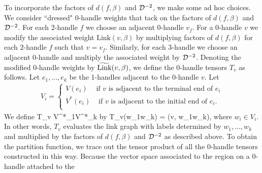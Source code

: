 To incorporate the factors of $d(f, \beta)$ and $\mathcal{D}^{-2}$, we make some ad hoc choices.
We consider ``dressed" 
0-handle weights that tack on the factors of $d(f,\beta)$ and $\mathcal{D}^{-2}$.
For each 2-handle $f$ we choose an adjacent 0-handle $v_f$.
For a 0-handle $v$ we modify the associated weight ${\text{Link}}(v,\beta)$ by multiplying factors of $d(f,\beta)$ for each 2-handle $f$ such that $v = v_f$.
Similarly, for each 3-handle we choose an adjacent 0-handle and multiply the associated weight by $\mathcal{D}^{-2}$.
Denoting the modified 0-handle weights by $\widetilde{\rm Link}(v,\beta)$, 
we define the 0-handle tensors $T_v$ as follows.
Let $e_1, \ldots, e_k$ be the 1-handles adjacent to the 0-handle $v$.
Let 
\begin{align}
\label{0_handleVectorspaces}
V_i = \begin{cases}
V(e_i) & \text{if $v$ is adjacent to the terminal end of $e_i$}\\
V^*(e_i) & \text{ if $v$ is adjacent to the initial end of $e_i$}.\\
\end{cases}
\end{align}
We define
\be
	T_v \in V^*_1\tp\cdots\tp V^*_k
\ee
by
\be
\label{vertex_tensor}
	T_v(w_1\tp\cdots\tp w_k) = (v, w_1\tp\cdots\tp w_k),
\ee
where $w_i\in V_i$.
In other words, $T_v$ evaluates the link graph with labels determined by $w_1,\ldots,w_k$ and multiplied by the factors of $d(f,\beta)$ and $\mathcal{D}^{-2}$ as described above.
To obtain the partition function, we trace out the tensor product of all the 0-handle tensors constructed in this way.
Because the vector space associated to the region on a $0$-handle attached to the 
